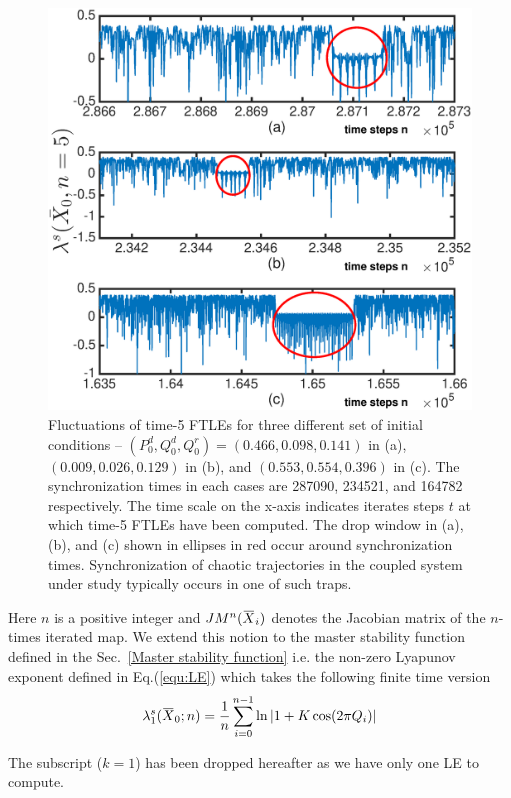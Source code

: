 \documentclass[reprint,superscriptaddress,amsmath,amssymb,aps,pre]{revtex4-1}
\newcommand{\overbar}[1]{\mkern 1.5mu\overline{\mkern-1.5mu#1\mkern-1.5mu}\mkern 1.5mu}
\begin{document}
\begin{figure}[t!]
	\includegraphics[scale=0.41]{FTLE_plots}
	\caption{\label{fig:FTLE}\footnotesize Fluctuations of time-5 FTLEs for three different set of initial conditions -- $(P^d_0,Q^d_0,Q^r_0) = (0.466,0.098,0.141)$ in (a),  $(0.009,0.026,0.129)$ in (b), and $(0.553,0.554,0.396)$ in (c). The synchronization times in each cases are 287090, 234521, and 164782 respectively. The time scale on the x-axis indicates iterates steps $t$ at which time-5 FTLEs have been computed. The drop window in (a), (b), and (c) shown in ellipses in red occur around synchronization times. Synchronization of chaotic trajectories in the coupled system under study typically occurs in one of such traps.}
\end{figure}

Here $n$ is a positive integer and $JM^n(\overbar{X}_i)$ denotes the Jacobian matrix of the $n$-times iterated map. We extend this notion to the master stability function defined in the Sec.~\ref{Master stability function}  i.e.  the non-zero Lyapunov exponent defined in Eq.(\ref{equ:LE}) 
which takes the following finite time version 
\begin{equation}
\lambda_1^s(\overbar{X}_0;n) = \frac{1}{n}\sum^{n-1}_{i=0}\ln|1 + K \cos (2\pi Q_i)|
\end{equation}

The subscript ($k = 1$) has been dropped hereafter as we have only one LE to compute.
\end{document}
